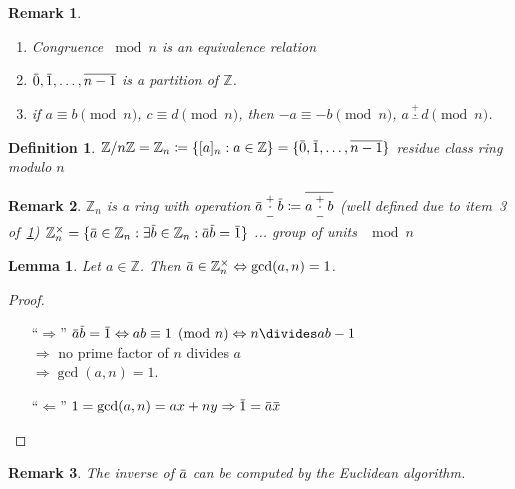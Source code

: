 \documentclass[a4paper]{article}
\newtheorem{defi}{Definition}
\newtheorem{rem}{Remark}
\newtheorem{lemma}{Lemma}
\newcommand{\Z}{\mathbb{Z}}
\newcommand{\overbar}[1]{\mkern 1.5mu\overline{\mkern-1.5mu#1\mkern-1.5mu}\mkern 1.5mu}
\begin{document}
\begin{rem}
\label{four}
\begin{enumerate}
  \item Congruence $\bmod{n}$ is an \emph{equivalence relation}
  \item $\overbar{0},\overbar{1},\dots,\overline{n-1}$ is a partition of $\Z$.
  \item if $a \equiv b \pmod{n}$, $c \equiv d \pmod{n}$, then 
  $-a \equiv -b \pmod{n}$,
  $a \overset{+}{\underset{-}{\cdot}} d \pmod{n}$.
\end{enumerate}
\end{rem}

\begin{defi}
$\Z / n\Z = \Z_n \coloneq \{[a]_n : a\in \Z\} = \{\overbar{0},\overbar{1},\dots,\overline{n-1}\}$ residue class ring modulo $n$
\end{defi}

\begin{rem}
$\Z_n$ is a ring with operation $\overbar{a} \overset{+}{\underset{-}{\cdot}} \overbar{b} \coloneq \overline{a\overset{+}{\underset{-}{\cdot}}b}$ (well defined due to item~3 of~\cref{four})
$\Z_n^\times = \{ \overbar{a} \in \Z_n : \exists \overbar{b} \in \Z_n : \overbar{a}\overbar{b} = \overbar{1} \}$ ... group of units $\mod n$
\end{rem}

\begin{lemma}
Let $a \in \Z$. Then $\overbar{a} \in \Z_n^\times \Leftrightarrow \gcd(a,n) = 1$.
\end{lemma}

\begin{proof}\hfill
\begin{itemize}
  \item[``$\Rightarrow$'']
    $\overbar{a}\overbar{b} = \overbar{1} \Leftrightarrow ab \equiv 1 \pmod{n} \Leftrightarrow n\divides ab-1$ \\
    $\Rightarrow$ no prime factor of $n$ divides $a$ \\
    $\Rightarrow \gcd(a,n) =1$.
  \item[``$\Leftarrow$'']
    $1 = \gcd(a,n) = ax + ny \Rightarrow \overbar{1} = \overbar{a}\overbar{x}$
\end{itemize}
\end{proof}

\begin{rem}
The inverse of $\overbar{a}$ can be computed by the Euclidean algorithm.
\end{rem}
\end{document}
